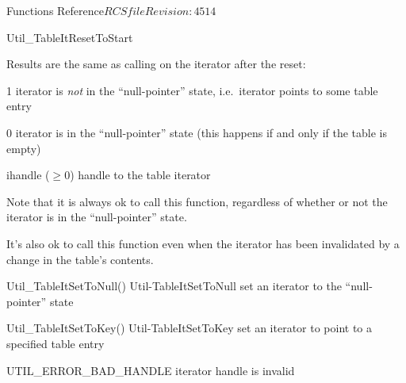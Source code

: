 \begin{cactuspart}{ Functions Reference}{$RCSfile$}{$Revision: 4514 $}
\begin{FunctionDescription}{Util\_TableItResetToStart}
\begin{ResultSection}
\begin{ResultNote}
Results are the same as calling 
on the iterator after the reset:
\end{ResultNote}
\begin{Result}{\rm 1}
iterator is {\em not\/} in the ``null-pointer'' state,
i.e.\ iterator points to some table entry
\end{Result}
\begin{Result}{\rm 0}
iterator is in the ``null-pointer'' state
(this happens if and only if the table is empty)
\end{Result}
\end{ResultSection}

\begin{ParameterSection}
\begin{Parameter}{ihandle ($\ge 0$)}
handle to the table iterator
\end{Parameter}
\end{ParameterSection}

\begin{Discussion}
Note that it is always ok to call this function, regardless of
whether or not the iterator is in the ``null-pointer'' state.

It's also ok to call this function even when the iterator has been
invalidated by a change in the table's contents.
\end{Discussion}

\begin{SeeAlsoSection}
\begin{SeeAlso2} {Util\_TableItSetToNull()} {Util-TableItSetToNull}
set an iterator to the ``null-pointer'' state
\end{SeeAlso2}
\begin{SeeAlso2} {Util\_TableItSetToKey()} {Util-TableItSetToKey}
set an iterator to point to a specified table entry
\end{SeeAlso2}
\end{SeeAlsoSection}

\begin{ErrorSection}
\begin{Error}{UTIL\_ERROR\_BAD\_HANDLE}
iterator handle is invalid
\end{Error}
\end{ErrorSection}
\end{FunctionDescription}



\end{cactuspart}
